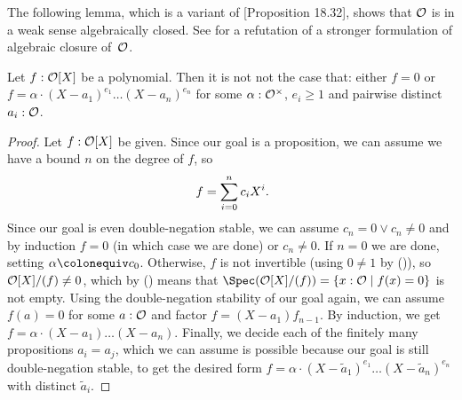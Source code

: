 The following lemma,
which is a variant of \cite{ingo-thesis}[Proposition 18.32],
shows that $\mathcal O$ is in a weak sense algebraically closed.
See  for a refutation of
a stronger formulation of algebraic closure of~$\mathcal O$.

\begin{lemma}%
  \label{polynomials-notnot-decompose}
  Let $f : \mathcal O[X]$ be a polynomial.
  Then it is not not the case that:
  either $f = 0$ or
  $f = \alpha \cdot {(X - a_1)}^{e_1} \dots {(X - a_n)}^{e_n}$
  for some $\alpha : \mathcal O^\times$,
  $e_i \geq 1$ and pairwise distinct $a_i : \mathcal O$.
\end{lemma}

\begin{proof}
  Let $f : \mathcal O[X]$ be given.
  Since our goal is a proposition,
  we can assume we have a bound $n$ on the degree of $f$,
  so
  \[ f = \sum_{i = 0}^n c_i X^i \rlap{.} \]
  Since our goal is even double-negation stable,
  we can assume $c_n = 0 \lor c_n \neq 0$
  and by induction $f = 0$ (in which case we are done)
  or $c_n \neq 0$.
  If $n = 0$ we are done,
  setting $\alpha \colonequiv c_0$.
  Otherwise,
  $f$ is not invertible (using $0 \neq 1$ by ()),
  so $\mathcal O[X]/(f) \neq 0$,
  which by () means that
  $\Spec(\A[X]/(f)) = \{ x : \A \mid f(x) = 0 \}$
  is not empty.
  Using the double-negation stability of our goal again,
  we can assume $f(a) = 0$ for some $a : \mathcal O$
  and factor $f = (X - a_1) f_{n - 1}$.
  By induction, we get $f = \alpha \cdot (X - a_1) \dots (X - a_n)$.
  Finally, we decide each of the finitely many propositions $a_i = a_j$,
  which we can assume is possible
  because our goal is still double-negation stable,
  to get the desired form
  $f = \alpha \cdot {(X - \widetilde{a}_1)}^{e_1} \dots {(X - \widetilde{a}_n)}^{e_n}$
  with distinct $\widetilde{a}_i$.
\end{proof}
